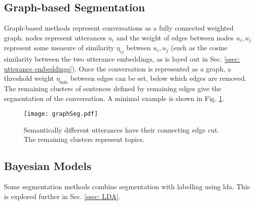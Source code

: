     \subsection{Graph-based Segmentation} 
    Graph-based methods represent conversations as a fully connected weighted graph: nodes represent \glspl{utterance} $u_i$ and the weight of edges between nodes $u_i, u_j$ represent some measure of similarity $\eta_{ij}$ between $u_i, u_j$ (such as the cosine similarity between the two \gls{utterance} \glspl{embedding}, as is layed out in Sec. \ref{ssec: utterance embeddings}). Once the conversation is represented as a graph, a threshold weight $\eta_{\text{min}}$ between edges can be set, below which edges are removed. The remaining clusters of sentences defined by remaining edges give the segmentation of the conversation.\cite{malioutov2006minimum} A minimal example is shown in Fig. \ref{fig: graph seg}.
    
    \begin{figure}[h]
    \centering
    \texttt{[image: graphSeg.pdf]}
    \caption{Semantically different \glspl{utterance} have their connecting edge cut. The remaining clusters represent topics.\label{fig: graph seg}}
    \end{figure}
     
    \subsection{Bayesian Models}
    Some segmentation methods\cite{eisenstein2008bayesian, purver2006unsupervised, nguyen2012sits} combine segmentation with labelling using \gls{lda}. This is explored further in Sec. \ref{ssec: LDA}.